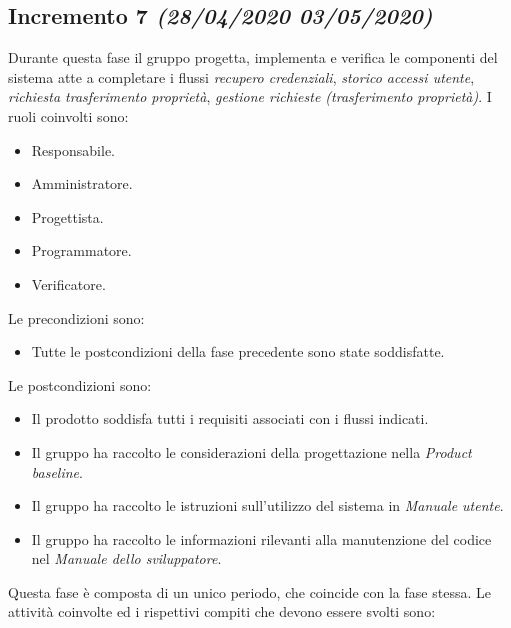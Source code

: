 \documentclass[../piano-di-progetto.tex]{subfiles}
\begin{document}
\subsection[Incremento 7]{Incremento 7 {\normalsize\normalfont\itshape(28/04/2020  03/05/2020)}}%
\label{sub:incremento_7}
Durante questa fase il gruppo progetta, implementa e verifica le componenti del sistema atte a completare i flussi \textit{recupero credenziali}, \textit{storico accessi utente}, \textit{richiesta trasferimento proprietà}, \textit{gestione richieste (trasferimento proprietà)}.
I ruoli coinvolti sono:
\begin{itemize}
  \item Responsabile.
  \item Amministratore.
  \item Progettista.
  \item Programmatore.
  \item Verificatore.
\end{itemize}
Le precondizioni sono:
\begin{itemize}
  \item Tutte le postcondizioni della fase precedente sono state soddisfatte.
\end{itemize}
Le postcondizioni sono:
\begin{itemize}
  \item Il prodotto soddisfa tutti i requisiti associati con i flussi indicati.
  \item Il gruppo ha raccolto le considerazioni della progettazione nella \textit{Product baseline}.
  \item Il gruppo ha raccolto le istruzioni sull'utilizzo del sistema in \textit{Manuale utente}.
  \item Il gruppo ha raccolto le informazioni rilevanti alla manutenzione del codice nel \textit{Manuale dello sviluppatore}.
\end{itemize}
Questa fase è composta di un unico periodo, che coincide con la fase stessa.
Le attività coinvolte ed i rispettivi compiti che devono essere svolti sono:
\end{document}
